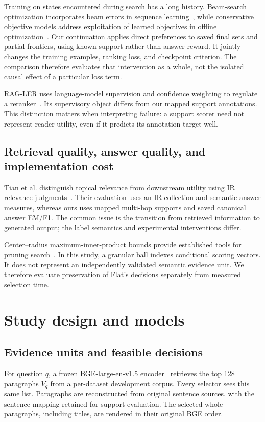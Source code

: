 \documentclass[preprint,12pt]{elsarticle}
\begin{document}
Training on states encountered during search has a long history. Beam-search optimization incorporates beam errors in sequence learning~\cite{wiseman2016bso}, while conservative objective models address exploitation of learned objectives in offline optimization~\cite{trabucco2021com}. Our continuation applies direct preferences to saved final sets and partial frontiers, using known support rather than answer reward. It jointly changes the training examples, ranking loss, and checkpoint criterion. The comparison therefore evaluates that intervention as a whole, not the isolated causal effect of a particular loss term.

RAG-LER uses language-model supervision and confidence weighting to regulate a reranker~\cite{zhai2025ragler}. Its supervisory object differs from our mapped support annotations. This distinction matters when interpreting failure: a support scorer need not represent reader utility, even if it predicts its annotation target well.

\subsection{Retrieval quality, answer quality, and implementation cost}
Tian et al. distinguish topical relevance from downstream utility using IR relevance judgments~\cite{tian2025relevance}. Their evaluation uses an IR collection and semantic answer measures, whereas ours uses mapped multi-hop supports and saved canonical answer EM/F1. The common issue is the transition from retrieved information to generated output; the label semantics and experimental interventions differ.

Center--radius maximum-inner-product bounds provide established tools for pruning search~\cite{ram2012tree}. In this study, a granular ball indexes conditional scoring vectors. It does not represent an independently validated semantic evidence unit. We therefore evaluate preservation of Flat's decisions separately from measured selection time.

\section{Study design and models}
\subsection{Evidence units and feasible decisions}
For question $q$, a frozen BGE-large-en-v1.5 encoder~\cite{xiao2023bge} retrieves the top 128 paragraphs $V_q$ from a per-dataset development corpus. Every selector sees this same list. Paragraphs are reconstructed from original sentence sources, with the sentence mapping retained for support evaluation. The selected whole paragraphs, including titles, are rendered in their original BGE order.
\end{document}
